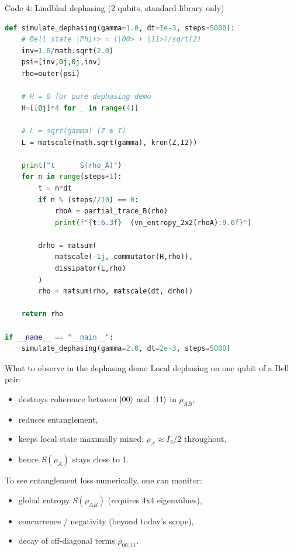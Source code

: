 \documentclass[aspectratio=169]{beamer}
\begin{document}
\begin{frame}[fragile]{Code 4: Lindblad dephasing (2 qubits, standard library only)}
\begin{lstlisting}[language=Python]
def simulate_dephasing(gamma=1.0, dt=1e-3, steps=5000):
    # Bell state |Phi+> = (|00> + |11>)/sqrt(2)
    inv=1.0/math.sqrt(2.0)
    psi=[inv,0j,0j,inv]
    rho=outer(psi)

    # H = 0 for pure dephasing demo
    H=[[0j]*4 for _ in range(4)]

    # L = sqrt(gamma) (Z ⊗ I)
    L = matscale(math.sqrt(gamma), kron(Z,I2))

    print("t      S(rho_A)")
    for n in range(steps+1):
        t = n*dt
        if n % (steps//10) == 0:
            rhoA = partial_trace_B(rho)
            print(f"{t:6.3f}  {vn_entropy_2x2(rhoA):9.6f}")

        drho = matsum(
            matscale(-1j, commutator(H,rho)),
            dissipator(L,rho)
        )
        rho = matsum(rho, matscale(dt, drho))

    return rho

if __name__ == "__main__":
    simulate_dephasing(gamma=2.0, dt=2e-3, steps=5000)
\end{lstlisting}
\end{frame}

\begin{frame}{What to observe in the dephasing demo}
Local dephasing on one qubit of a Bell pair:
\begin{itemize}
\item destroys coherence between $\ket{00}$ and $\ket{11}$ in $\rho_{AB}$,
\item reduces entanglement,
\item keeps local state maximally mixed: $\rho_A \approx I_2/2$ throughout,
\item hence $S(\rho_A)$ stays close to 1.
\end{itemize}

\medskip
To see entanglement loss numerically, one can monitor:
\begin{itemize}
\item global entropy $S(\rho_{AB})$ (requires 4x4 eigenvalues),
\item concurrence / negativity (beyond today's scope),
\item decay of off-diagonal terms $\rho_{00,11}$.
\end{itemize}
\end{frame}
\end{document}
